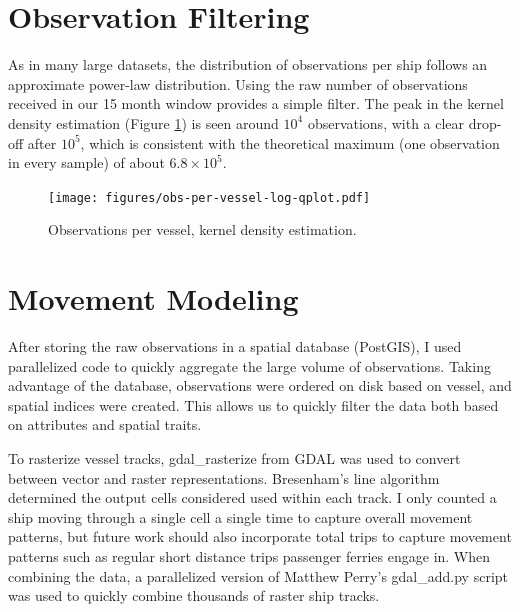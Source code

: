 \section{Observation Filtering}
As in many large datasets, the distribution of observations per ship follows an approximate power-law distribution. Using the raw number of observations received in our 15 month window provides a simple filter. The peak in the kernel density estimation (Figure \ref{fig:obs-per-vessel-log}) is seen around $10^4$ observations, with a clear drop-off after $10^5$, which is consistent with the theoretical maximum (one observation in every sample) of about $6.8 \times 10^5$.
\begin{figure}[htbp]
  \centering
  \texttt{[image: figures/obs-per-vessel-log-qplot.pdf]}
  \caption[Observations per vessel]{Observations per vessel, kernel density estimation.}
  \label{fig:obs-per-vessel-log}
\end{figure}

\section{Movement Modeling}
\label{sec:movement-modeling-appendix}


After storing the raw observations in a spatial database (PostGIS), I used parallelized code to quickly aggregate the large volume of observations. Taking advantage of the database, observations were ordered on disk based on vessel, and spatial indices were created. This allows us to quickly filter the data both based on attributes and spatial traits.

To rasterize vessel tracks, \textsf{gdal\_rasterize} from \textsf{GDAL} was used to convert between vector and raster representations.  Bresenham's line algorithm~\cite{bresenham1965} determined the output cells considered used within each track. I only counted a ship moving through a single cell a single time to capture overall movement patterns, but future work should also incorporate total trips to capture movement patterns such as regular short distance trips passenger ferries engage in. When combining the data, a parallelized version of Matthew Perry's \textsf{gdal\_add.py} script was used to quickly combine thousands of raster ship tracks.

